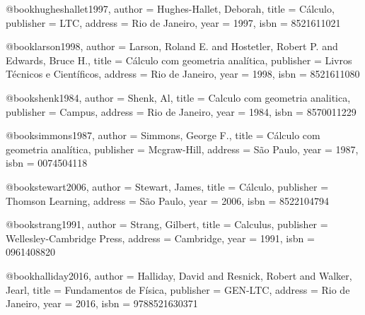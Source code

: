@book{hugheshallet1997,
  author = {Hughes-Hallet, Deborah},
  title = {Cálculo},
  publisher = {LTC},
  address = {Rio de Janeiro},
  year = {1997},
  isbn = {8521611021}
}

@book{larson1998,
  author = {Larson, Roland E. and Hostetler, Robert P. and Edwards, Bruce H.},
  title = {Cálculo com geometria analítica},
  publisher = {Livros Técnicos e Científicos},
  address = {Rio de Janeiro},
  year = {1998}, %
  isbn = {8521611080}
}

@book{shenk1984,
  author = {Shenk, Al},
  title = {Calculo com geometria analitica},
  publisher = {Campus},
  address = {Rio de Janeiro},
  year = {1984},
  isbn = {8570011229} %
}

@book{simmons1987,
  author = {Simmons, George F.},
  title = {Cálculo com geometria analítica},
  publisher = {Mcgraw-Hill},
  address = {São Paulo},
  year = {1987}, %
  isbn = {0074504118}
}

@book{stewart2006,
  author = {Stewart, James},
  title = {Cálculo},
  publisher = {Thomson Learning},
  address = {São Paulo},
  year = {2006},
  isbn = {8522104794} %
}

@book{strang1991,
  author = {Strang, Gilbert},
  title = {Calculus},
  publisher = {Wellesley-Cambridge Press},
  address = {Cambridge},
  year = {1991},
  isbn = {0961408820}
}

%

@book{halliday2016,
  author = {Halliday, David and Resnick, Robert and Walker, Jearl},
  title = {Fundamentos de Física},
  publisher = {GEN-LTC},
  address = {Rio de Janeiro},
  year = {2016},
  isbn = {9788521630371}%
}

